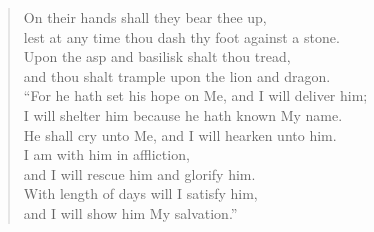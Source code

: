 {\begin{verse}
				On their hands shall they bear thee up,\nolinebreak\\
				lest at any time thou dash thy foot against a stone.\nolinebreak\\
				Upon the asp and basilisk shalt thou tread,\nolinebreak\\
				and thou shalt trample upon the lion and dragon.\nolinebreak\\
				``For he hath set his hope on Me, and I will deliver him;\nolinebreak\\
				I will shelter him because he hath known My name.\nolinebreak\\
				He shall cry unto Me, and I will hearken unto him.\nolinebreak\\
				I am with him in affliction,\nolinebreak\\
				and I will rescue him and glorify him.\nolinebreak\\
				With length of days will I satisfy him,\nolinebreak\\
				and I will show him My salvation.''
			\end{verse}
}
